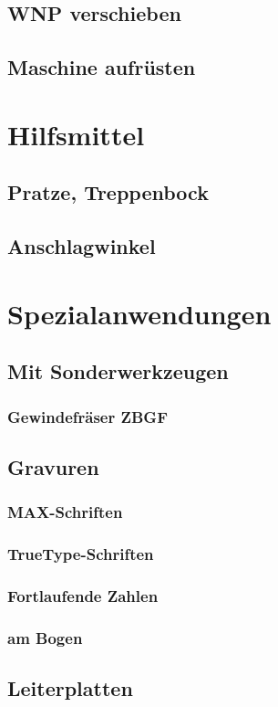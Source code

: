 \documentclass[a4paper]{book}
\begin{document}
		\subsection{WNP verschieben} 
		\subsection{Maschine aufrüsten}
	\section{Hilfsmittel} 
		\subsection{Pratze, Treppenbock} 
		\subsection{Anschlagwinkel} 		 
	\section{Spezialanwendungen} 
		\subsection{Mit Sonderwerkzeugen}
			\subsubsection{Gewindefräser ZBGF} 
		\subsection{Gravuren} 
			\subsubsection{MAX-Schriften} 
			\subsubsection{TrueType-Schriften} 
			\subsubsection{Fortlaufende Zahlen}
			\subsubsection{am Bogen}
		\subsection{Leiterplatten} 
\end{document}

